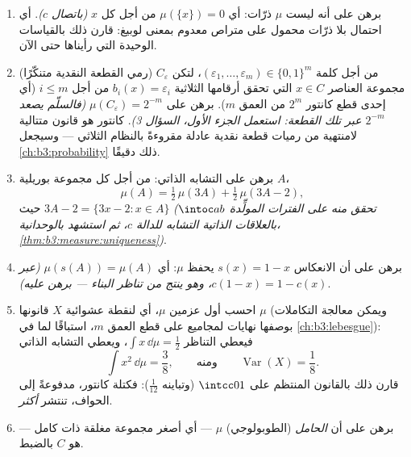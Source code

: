 \begin{problem}
\begin{enumerate}[resume]
\[        \]
        أي إن $\mu$ و $\lambda$ يعيشان على حاملين منفصلين ($C$
        ومتممها). ويُقال عن قياسين في هذا الوضع إنهما
        \emph{مفردان تبادليًا}، ويُكتب $\mu \perp
        \lambda$.
  \item برهن على أنه ليست  $\mu$ ذرّات: أي $\mu(\{x\}) = 0$ من
        أجل كل $x$ \emph{(باتصال $c$)}. أي  احتمال بلا ذرّات
        محمول على متراص معدوم  بمعنى لوبيغ: قارن ذلك
        بالقياسات الوحيدة التي رأيناها حتى الآن.
  \item (رمي القطعة النقدية متنكّرًا) من أجل كلمة $(\varepsilon_1,
        \dots, \varepsilon_m) \in \{0,1\}^m$، لتكن
        $C_{\varepsilon}$ مجموعة العناصر $x \in C$ التي تحقق أرقامها
        الثلاثية $b_i(x) = \varepsilon_i$ من أجل $i \leq m$ (أي إحدى قطع كانتور
        $2^m$ من العمق $m$). برهن على $\mu(C_\varepsilon) = 2^{-m}$ \emph{(فالسلّم
        يصعد $2^{-m}$ عبر تلك القطعة: استعمل الجزء الأول،
        السؤال 3)}.  كانتور هو قانون متتالية لامنتهية من
        رميات قطعة نقدية عادلة مقروءةً بالنظام الثلاثي ---
        وسيجعل \cref{ch:b3:probability} ذلك دقيقًا.
  \item برهن على التشابه الذاتي: من أجل كل مجموعة بوريلية $A$،
        \[
        \mu(A) = \tfrac12\,\mu(3A) +
        \tfrac12\,\mu(3A - 2) ,
        \]
        حيث $3A - 2 = \{3x - 2 : x \in A\}$ \emph{(تحقق منه على الفترات المولِّدة
        $\intoc ab$ بالعلاقات الذاتية التشابه للدالة $c$، ثم
        استشهد بالوحدانية، \cref{thm:b3:measure:uniqueness})}.
  \item برهن على أن الانعكاس $s(x) = 1 - x$ يحفظ $\mu$: أي
        $\mu(s(A)) = \mu(A)$ \emph{(عبر $c(1 - x) = 1 -
        c(x)$، وهو ينتج من تناظر البناء ---
        برهن عليه)}.
  \item احسب أول عزمين  $\mu$، أي لنقطة عشوائية $X$
        قانونها $\mu$ (ويمكن معالجة التكاملات بوصفها نهايات
        لمجاميع على قطع العمق $m$، استباقًا لما في \cref{ch:b3:lebesgue}):
        فيعطي التناظر $\int x\,\dd\mu = \frac12$، ويعطي التشابه الذاتي
        \[
        \int x^2\,\dd\mu = \frac38,
        \qquad\text{ومنه}\qquad
        \operatorname{Var}(X) = \frac18 .
        \]
        قارن ذلك بالقانون المنتظم على $\intcc01$ (وتباينه
        $\frac1{12}$): فكتلة كانتور، مدفوعةً إلى الحواف، تنتشر
        \emph{أكثر}.
  \item برهن على أن \emph{الحامل} (الطوبولوجي)  $\mu$ ---
        أي أصغر مجموعة مغلقة ذات  كامل --- هو $C$ بالضبط.

\end{enumerate}
\end{problem}
